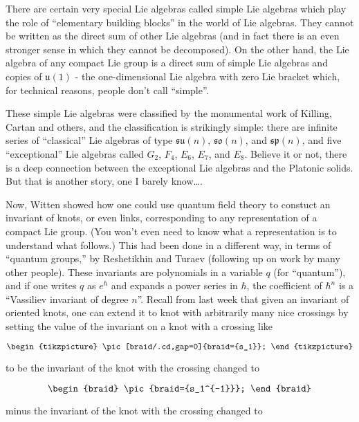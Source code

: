 \documentclass{article}
\begin{document}
There are certain very special Lie algebras called simple Lie algebras
which play the role of ``elementary building blocks'' in the world of
Lie algebras. They cannot be written as the direct sum of other Lie
algebras (and in fact there is an even stronger sense in which they
cannot be decomposed). On the other hand, the Lie algebra of any compact
Lie group is a direct sum of simple Lie algebras and copies of
\(\mathfrak{u}(1)\) - the one-dimensional Lie algebra with zero Lie
bracket which, for technical reasons, people don't call ``simple''.

These simple Lie algebras were classified by the monumental work of
Killing, Cartan and others, and the classification is strikingly simple:
there are infinite series of ``classical'' Lie algebras of type
\(\mathfrak{su}(n)\), \(\mathfrak{so}(n)\), and \(\mathfrak{sp}(n)\),
and five ``exceptional'' Lie algebras called \(G_2\), \(F_4\), \(E_6\),
\(E_7\), and \(E_8\). Believe it or not, there is a deep connection
between the exceptional Lie algebras and the Platonic solids. But that
is another story, one I barely know\ldots.

Now, Witten showed how one could use quantum field theory to constuct an
invariant of knots, or even links, corresponding to any representation
of a compact Lie group. (You won't even need to know what a
representation is to understand what follows.) This had been done in a
different way, in terms of ``quantum groups,'' by Reshetikhin and Turaev
(following up on work by many other people). These invariants are
polynomials in a variable \(q\) (for ``quantum''), and if one writes
\(q\) as \(e^\hbar\) and expands a power series in \(\hbar\), the
coefficient of \(\hbar^n\) is a ``Vassiliev invariant of degree \(n\)''.
Recall from last week that given an invariant of oriented knots, one can
extend it to knot with arbitrarily many nice crossings by setting the
value of the invariant on a knot with a crossing like

\[
  \begin{tikzpicture}
    \pic[braid/.cd,gap=0]{braid={s_1}};
  \end{tikzpicture}
\]

to be the invariant of the knot with the crossing changed to

\[
  \begin{braid}
    \pic{braid={s_1^{-1}}};
  \end{braid}
\]

minus the invariant of the knot with the crossing changed to
\end{document}
